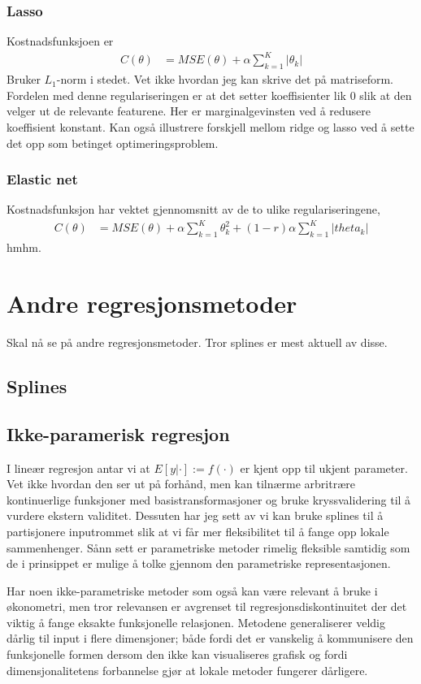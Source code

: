 \subsubsection{Lasso}
Kostnadsfunksjoen er
\begin{align}
C(\theta) &= MSE(\theta)+\alpha\sum_{k=1}^K|\theta_k|
\end{align}
Bruker $L_1$-norm i stedet. Vet ikke hvordan jeg kan skrive det på matriseform. Fordelen med denne regulariseringen er at det setter koeffisienter lik $0$ slik at den velger ut de relevante featurene. Her er marginalgevinsten ved å redusere koeffisient konstant. Kan også illustrere forskjell mellom ridge og lasso ved å sette det opp som betinget optimeringsproblem.
\subsubsection{Elastic net}
Kostnadsfunksjon har vektet gjennomsnitt av de to ulike regulariseringene,
\begin{align}
C(\theta) &= MSE(\theta)+\alpha\sum_{k=1}^K\theta_k^2+(1-r)\alpha\sum_{k=1}^K|theta_k|
\end{align}
hmhm. 
\section{Andre regresjonsmetoder}
Skal nå se på andre regresjonsmetoder. Tror splines er mest aktuell av disse.
\subsection{Splines}
\subsection{Ikke-paramerisk regresjon}
I lineær regresjon antar vi at $E[y|\cdot]:=f(\cdot)$ er kjent opp til ukjent parameter. Vet ikke hvordan den ser ut på forhånd, men kan tilnærme arbritrære kontinuerlige funksjoner med basistransformasjoner og bruke kryssvalidering til å vurdere ekstern validitet. Dessuten har jeg sett av vi kan bruke splines til å partisjonere inputrommet slik at vi får mer fleksibilitet til å fange opp lokale sammenhenger. Sånn sett er parametriske metoder rimelig fleksible samtidig som de i prinsippet er mulige å tolke gjennom den parametriske representasjonen.

Har noen ikke-parametriske metoder som også kan være relevant å bruke i økonometri, men tror relevansen er avgrenset til regresjonsdiskontinuitet der det viktig å fange eksakte funksjonelle relasjonen. Metodene generaliserer veldig dårlig til input i flere dimensjoner; både fordi det er vanskelig å kommunisere den funksjonelle formen dersom den ikke kan visualiseres grafisk og fordi dimensjonalitetens forbannelse gjør at lokale metoder fungerer dårligere. 
